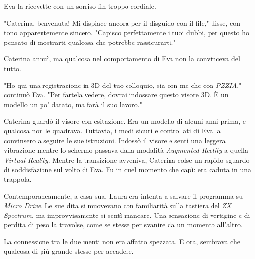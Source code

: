 Eva la ricevette con un sorriso fin troppo cordiale.

"Caterina, benvenuta! Mi dispiace ancora per il disguido con il file," disse, con tono apparentemente sincero. "Capisco perfettamente i tuoi dubbi, per questo ho pensato di mostrarti qualcosa che potrebbe rassicurarti."

Caterina annuì, ma qualcosa nel comportamento di Eva non la convinceva del tutto.

"Ho qui una registrazione in 3D del tuo colloquio, sia con me che con \emph{PZZIA}," continuò Eva. "Per fartela vedere, dovrai indossare questo visore 3D. È un modello un po' datato, ma farà il suo lavoro."

Caterina guardò il visore con esitazione. Era un modello di alcuni anni prima, e qualcosa non le quadrava. Tuttavia, i modi sicuri e controllati di Eva la convinsero a seguire le sue istruzioni. Indossò il visore e sentì una leggera vibrazione mentre lo schermo passava dalla modalità \emph{Augmented Reality} a quella \emph{Virtual Reality}. Mentre la transizione avveniva, Caterina colse un rapido sguardo di soddisfazione sul volto di Eva. Fu in quel momento che capì: era caduta in una trappola.

Contemporaneamente, a casa sua, Laura era intenta a salvare il programma su \emph{Micro Drive}. Le sue dita si muovevano con familiarità sulla tastiera del \emph{ZX Spectrum}, ma improvvisamente si sentì mancare. Una sensazione di vertigine e di perdita di peso la travolse, come se stesse per svanire da un momento all'altro.

La connessione tra le due menti non era affatto spezzata. E ora, sembrava che qualcosa di più grande stesse per accadere.

